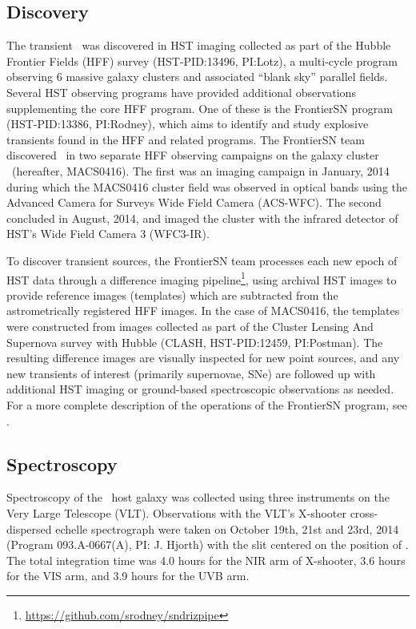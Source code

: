 \subsection{Discovery}\label{sec:Discovery}

The transient \spock\ was discovered in HST imaging collected as part
of the Hubble Frontier Fields (HFF) survey (HST-PID:13496, PI:Lotz), a
multi-cycle program observing 6 massive galaxy clusters and associated
``blank sky'' parallel fields.  Several HST observing programs have
provided additional observations supplementing the core HFF program.
One of these is the FrontierSN program (HST-PID:13386, PI:Rodney),
which aims to identify and study explosive transients found in the HFF
and related programs.  The FrontierSN team discovered \spock\ in two
separate HFF observing campaigns on the galaxy cluster
\ (hereafter, MACS0416).  The first was an imaging campaign
in January, 2014 during which the MACS0416 cluster field was observed
in optical bands using the Advanced Camera for Surveys Wide Field
Camera (ACS-WFC).  The second concluded in August, 2014, and imaged
the cluster with the infrared detector of HST's Wide Field Camera 3
(WFC3-IR).

To discover transient sources, the FrontierSN team processes each new
epoch of HST data through a difference imaging
pipeline\footnote{\url{https://github.com/srodney/sndrizpipe}}, using
archival HST images to provide reference images (templates) which are
subtracted from the astrometrically registered HFF images. In the case
of MACS0416, the templates were constructed from images collected as
part of the Cluster Lensing And Supernova survey with Hubble (CLASH,
HST-PID:12459, PI:Postman). The resulting difference images are
visually inspected for new point sources, and any new transients of
interest (primarily supernovae, SNe) are followed up with additional
HST imaging or ground-based spectroscopic observations as needed.  For
a more complete description of the operations of the FrontierSN
program, see \citet{Rodney:2015a}.

\subsection{Spectroscopy}\label{sec:Spectroscopy}

Spectroscopy of the \spock\ host galaxy was collected using
three instruments on the Very Large Telescope (VLT).   Observations with the VLT's
X-shooter cross-dispersed echelle spectrograph \citep{Vernet:2011}
were taken on October 19th, 21st and 23rd, 2014 (Program
093.A-0667(A), PI: J. Hjorth) with the slit centered on the position
of .  The total integration time was 4.0 hours for the NIR arm
of X-shooter, 3.6 hours for the VIS arm, and 3.9 hours for the UVB
arm.  


